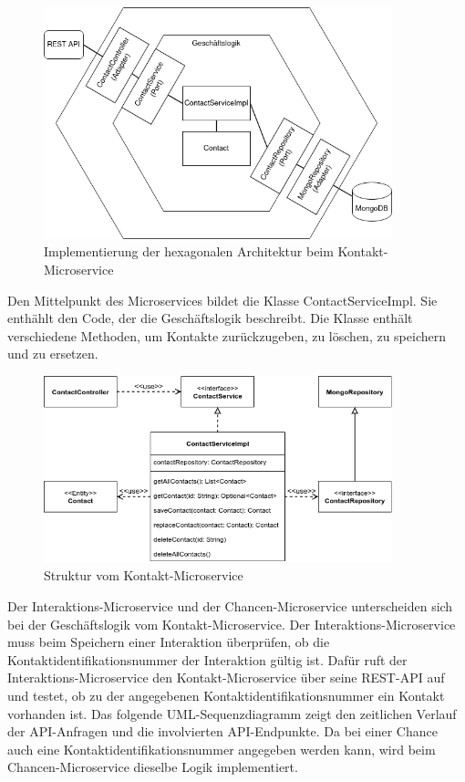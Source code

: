 \begin{figure}[H] 
    \centering
    \includegraphics[width=0.9\textwidth]{figures/HexagonalDesign.png}
    \caption{Implementierung der hexagonalen Architektur beim Kontakt-Microservice}
\end{figure}

Den Mittelpunkt des Microservices bildet die Klasse ContactServiceImpl. Sie enthählt den Code, der die Geschäftslogik beschreibt. Die Klasse enthält verschiedene Methoden, um Kontakte zurückzugeben, zu löschen, zu speichern und zu ersetzen.

\begin{figure}[H] 
    \centering
    \includegraphics[width=0.9\textwidth]{figures/UMLKlassenDiagrammKontakt.png}
    \caption{Struktur vom Kontakt-Microservice}
\end{figure}

Der Interaktions-Microservice und der Chancen-Microservice unterscheiden sich bei der Geschäftslogik vom Kontakt-Microservice. Der Interaktions-Microservice muss beim Speichern einer Interaktion überprüfen, ob die Kontaktidentifikationsnummer der Interaktion gültig ist. Dafür ruft der Interaktions-Microservice den Kontakt-Microservice über seine \ac{REST}-\ac{API} auf und testet, ob zu der angegebenen Kontaktidentifikationsnummer ein Kontakt vorhanden ist. Das folgende \ac{UML}-Sequenzdiagramm zeigt den zeitlichen Verlauf der \ac{API}-Anfragen und die involvierten \ac{API}-Endpunkte. Da bei einer Chance auch eine Kontaktidentifikationsnummer angegeben werden kann, wird beim Chancen-Microservice dieselbe Logik implementiert.

